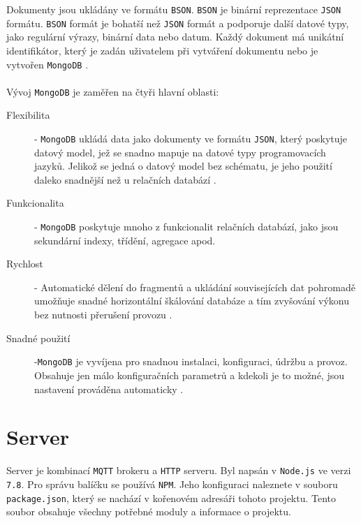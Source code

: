\documentclass[czech,BP]{thesiskiv}
\begin{document}
Dokumenty jsou ukládány ve formátu \texttt{BSON}. \texttt{BSON} je binární reprezentace \texttt{JSON} formátu. \texttt{BSON} formát je bohatší než \texttt{JSON} formát a podporuje další datové typy, jako regulární výrazy, binární data nebo datum. Každý dokument má unikátní identifikátor, který je zadán uživatelem při vytváření dokumentu nebo je vytvořen \texttt{MongoDB} \cite{houvzvivcka2012aplikace}.
\\\\
Vývoj \texttt{MongoDB} je zaměřen na čtyři hlavní oblasti:
\begin{description}
\item [Flexibilita]
- \texttt{MongoDB} ukládá data jako dokumenty ve formátu \texttt{JSON}, který poskytuje datový model, jež se snadno mapuje na datové typy programovacích jazyků. Jelikož se jedná o datový model bez schématu, je jeho použití daleko snadnější než u relačních databází \cite{houvzvivcka2012aplikace}.

\item [Funkcionalita] - \texttt{MongoDB} poskytuje mnoho z funkcionalit relačních databází, jako jsou sekundární indexy, třídění, agregace apod. \cite{houvzvivcka2012aplikace}
\item [Rychlost] - Automatické dělení do fragmentů a ukládání souvisejících dat pohromadě umožňuje snadné horizontální škálování databáze a tím zvyšování výkonu bez nutnosti přerušení provozu \cite{houvzvivcka2012aplikace}.
\item [Snadné použití] -\texttt{MongoDB} je vyvíjena pro snadnou instalaci, konfiguraci, údržbu a provoz. Obsahuje jen málo konfiguračních parametrů a kdekoli je to možné, jsou nastavení prováděna automaticky \cite{houvzvivcka2012aplikace}.
\end{description}
	
	
	
	
	
	
	
	
	
	
	
	
	
	
	
	
	
	
	
	
	
	
	
\chapter{Server}
	
	Server je kombinací \texttt{MQTT} brokeru a \texttt{HTTP} serveru.
    Byl napsán v \texttt{Node.js} ve verzi \texttt{7.8}.
  Pro správu balíčku se používá \texttt{NPM}. Jeho konfiguraci naleznete v souboru \texttt{package.json}, který se nachází v kořenovém adresáři tohoto projektu. Tento soubor obsahuje všechny potřebné moduly a informace o projektu.
	
\end{document}
